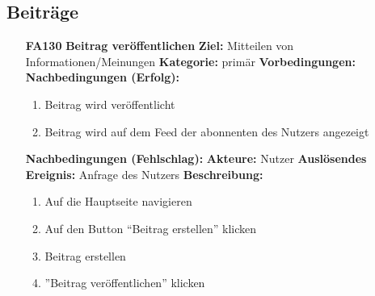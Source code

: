 \documentclass[parskip=full]{scrartcl}
\begin{document}
		\subsection{Beiträge}
		\begin{itemize}[nosep]
			\item[\textbf{FA130}]\textbf{Beitrag veröffentlichen}
			\newline \textbf{Ziel:} Mitteilen von Informationen/Meinungen
			\newline \textbf{Kategorie:} primär
			\newline \textbf{Vorbedingungen:}
			\newline \textbf{Nachbedingungen (Erfolg):}
			\begin{enumerate}[nosep]
				\item Beitrag wird  veröffentlicht
				\item Beitrag wird auf dem \gls{Feed} der abonnenten des Nutzers angezeigt
			\end{enumerate}
			\textbf{Nachbedingungen (Fehlschlag):}
			\newline \textbf{Akteure:} Nutzer
			\newline \textbf{Auslösendes Ereignis:} Anfrage des Nutzers
			\newline \textbf{Beschreibung:}
			\begin{enumerate}[nosep]
				\item Auf die Hauptseite navigieren
				\item Auf den Button “Beitrag erstellen” klicken
				\item Beitrag erstellen
				\item ”Beitrag veröffentlichen” klicken\\
			\end{enumerate}
			

\end{itemize}
\end{document}
